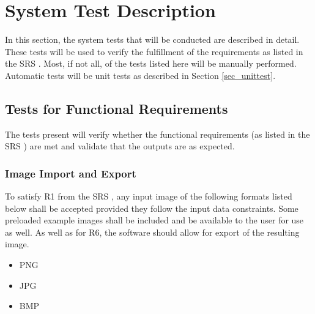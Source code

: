 \documentclass[12pt, titlepage]{article}
\begin{document}
\section{System Test Description} \label{sec_systest_desc}

In this section, the system tests that will be conducted are described in detail. These tests
will be used to verify the fulfillment of the requirements as listed in the SRS \citep{SRS}.
Most, if not all, of the tests listed here will be manually performed. Automatic
tests will be unit tests as described in Section \ref{sec_unittest}.

\subsection{Tests for Functional Requirements}

The tests present will verify whether the functional requirements 
(as listed in the SRS \cite{SRS}) are met and validate that the outputs
are as expected.

\subsubsection{Image Import and Export} \label{subsec_img_io}

To satisfy R1 from the SRS \citep{SRS}, any input image of the following formats listed below shall be 
accepted provided they follow the input data constraints.
Some preloaded example images shall be included and be available to the user for use as well.
As well as for R6, the software should allow for export of the resulting image.

\begin{itemize}
  \item{PNG}
  \item{JPG}
  \item{BMP\\}
\end{itemize}
\end{document}
